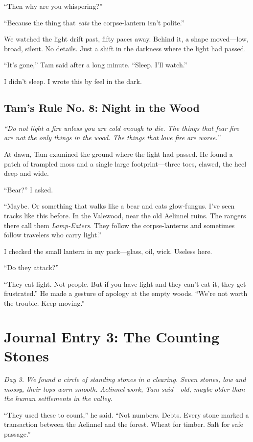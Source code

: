 \documentclass[11pt]{article}
\begin{document}
``Then why are you whispering?''

``Because the thing that \textit{eats} the corpse-lantern isn't polite.''

We watched the light drift past, fifty paces away. Behind it, a shape moved---low, broad, silent. No details. Just a shift in the darkness where the light had passed.

``It's gone,'' Tam said after a long minute. ``Sleep. I'll watch.''

I didn't sleep. I wrote this by feel in the dark.

\subsection*{Tam's Rule No. 8: Night in the Wood}
\textit{``Do not light a fire unless you are cold enough to die. The things that fear fire are not the only things in the wood. The things that love fire are worse.''}

At dawn, Tam examined the ground where the light had passed. He found a patch of trampled moss and a single large footprint---three toes, clawed, the heel deep and wide.

``Bear?'' I asked.

``Maybe. Or something that walks like a bear and eats glow-fungus. I've seen tracks like this before. In the Valewood, near the old Aelinnel ruins. The rangers there call them \textit{Lamp-Eaters}. They follow the corpse-lanterns and sometimes follow travelers who carry light.''

I checked the small lantern in my pack---glass, oil, wick. Useless here.

``Do they attack?''

``They eat light. Not people. But if you have light and they can't eat it, they get frustrated.'' He made a gesture of apology at the empty woods. ``We're not worth the trouble. Keep moving.''

\section*{Journal Entry 3: The Counting Stones}
\textit{Day 3. We found a circle of standing stones in a clearing. Seven stones, low and mossy, their tops worn smooth. Aelinnel work, Tam said---old, maybe older than the human settlements in the valley.}

``They used these to count,'' he said. ``Not numbers. Debts. Every stone marked a transaction between the Aelinnel and the forest. Wheat for timber. Salt for safe passage.''
\end{document}
